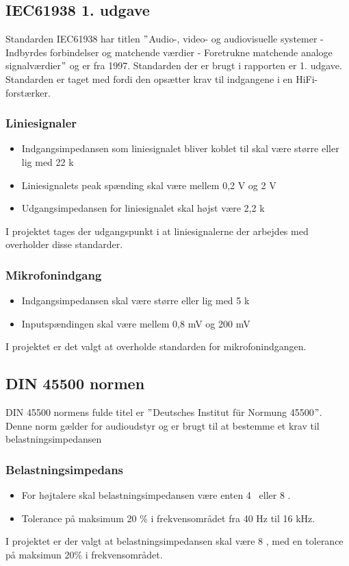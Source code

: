 \subsection*{IEC61938 1. udgave}
\label{IEC61938}
Standarden IEC61938 har titlen $"$Audio-, video- og audiovisuelle systemer - Indbyrdes forbindelser og matchende værdier - Foretrukne matchende analoge signalværdier$"$ og er fra 1997. Standarden der er brugt i rapporten er 1. udgave. Standarden er taget med fordi den opsætter krav til indgangene i en HiFi-forstærker\cite{IEC61938}. 

\subsubsection*{Liniesignaler} 
\begin{itemize}
\item Indgangsimpedansen som liniesignalet bliver koblet til skal være større eller lig med 22 k\ohm 
\item Liniesignalets peak spænding skal være mellem 0,2 V og 2 V
\item Udgangsimpedansen for liniesignalet skal højst være 2,2 k\ohm
\end{itemize}
I projektet tages der udgangspunkt i at liniesignalerne der arbejdes med overholder disse standarder.

\subsubsection*{Mikrofonindgang}
\begin{itemize}
\item Indgangsimpedansen skal være større eller lig med 5 k\ohm
\item Inputspændingen skal være mellem 0,8 mV og 200 mV
\end{itemize}
I projektet er det valgt at overholde standarden for mikrofonindgangen.

\subsection*{DIN 45500 normen}
\label{DIN45500}
DIN 45500 normens fulde titel er $"$Deutsches Institut f\"{u}r Normung 45500$"$. Denne norm gælder for audioudstyr og er brugt til at bestemme et krav til belastningsimpedansen

\subsubsection*{Belastningsimpedans}
\begin{itemize}
\item For højtalere skal belastningsimpedansen være enten 4 \ohm~eller 8 \ohm.
\item Tolerance på maksimum 20 \% i frekvensområdet fra 40 Hz til 16 kHz.
\end{itemize}
I projektet er der valgt at belastningsimpedansen skal være 8 \ohm, med en tolerance på maksimun 20\% i frekvensområdet.